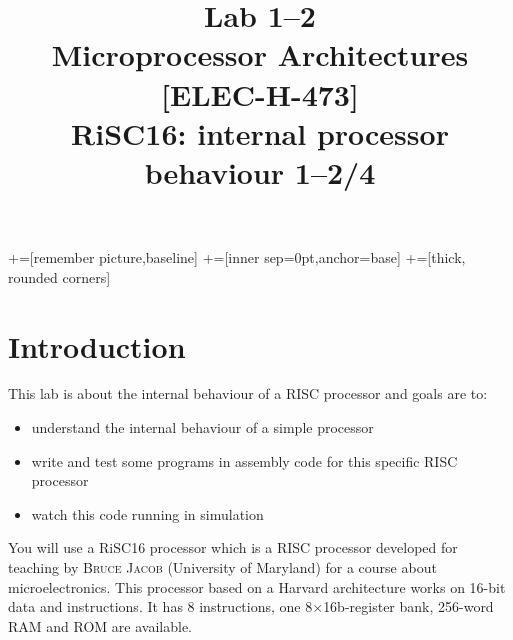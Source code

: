 \documentclass[10pt,a4paper]{article}
\date{\vspace{-1cm}\version}
\title{\vspace{-2cm} Lab 1--2\\ Microprocessor Architectures [ELEC-H-473]\\ RiSC16: internal processor behaviour 1--2/4 \ifthenelse{\boolean{corrige}}{~\\Corrigé}{}}
\theoremstyle{definition}%
\begin{document}
\newcommand\tabnode[1]{\addtocounter{nodecount}{1} \tikz \node (\arabic{nodecount}) {#1};}

+=[remember picture,baseline]
+=[inner sep=0pt,anchor=base]
+=[thick, rounded corners]



\maketitle

%


\section*{Introduction}

This lab is about the internal behaviour of a RISC processor and goals are to:
\begin{itemize}
\item understand the internal behaviour of a simple processor
\item write and test some programs in assembly code for this specific RISC processor
\item watch this code running in simulation 
\end{itemize}
You will use a RiSC16 processor which is a RISC processor developed for teaching by \textsc{Bruce Jacob} (University of Maryland) for a course about microelectronics.
This processor based on a Harvard architecture works on 16-bit data and instructions. It has 8 instructions, one 8$\times$16b-register bank, 256-word RAM and ROM are available.

\end{document}
